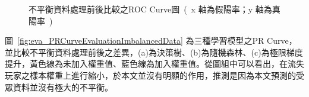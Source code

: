 \begin{figure}[!htb]
    \centering
    \caption[不平衡資料處理前後比較之ROC Curve圖]{不平衡資料處理前後比較之ROC Curve圖\ (\ x 軸為假陽率；y 軸為真陽率\ )}
    \label{fig:eva_ROCCurveEvaluationImbalancedData}
\end{figure}
\newpage

圖~\ref{fig:eva_PRCurveEvaluationImbalancedData} 為三種學習模型之PR Curve，並比較不平衡資料處理前後之差異，(a)為決策樹、(b)為隨機森林、(c)為極限梯度提升，黃色線為未加入權重值、藍色線為加入權重值。從圖組中可以看出，在流失玩家之樣本權重上進行縮小，於本文並沒有明顯的作用，推測是因為本文預測的受眾資料並沒有極大的不平衡。

